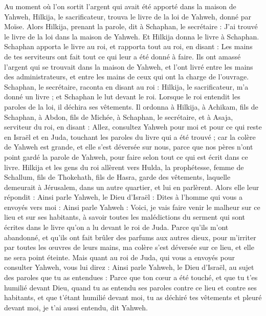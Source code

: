 \begin{multicols}{2}
Au moment où l'on sortit l'argent qui avait été apporté dans la maison de Yahweh, Hilkija, le sacrificateur, trouva le livre de la loi de Yahweh, donné par Moïse.
Alors Hilkija, prenant la parole, dit à Schaphan, le secrétaire : J'ai trouvé le livre de la loi dans la maison de Yahweh. Et Hilkija donna le livre à Schaphan.
Schaphan apporta le livre au roi, et rapporta tout au roi, en disant : Les mains de tes serviteurs ont fait tout ce qui leur a été donné à faire.
Ils ont amassé l'argent qui se trouvait dans la maison de Yahweh, et l'ont livré entre les mains des administrateurs, et entre les mains de ceux qui ont la charge de l'ouvrage.
Schaphan, le secrétaire, raconta en disant au roi : Hilkija, le sacrificateur, m'a donné un livre ; et Schaphan le lut devant le roi.
Lorsque le roi entendit les paroles de la loi, il déchira ses vêtements.
Il ordonna à Hilkija, à Achikam, fils de Schaphan, à Abdon, fils de Michée, à Schaphan, le secrétaire, et à Asaja, serviteur du roi, en disant :
Allez, consultez Yahweh pour moi et pour ce qui reste en Israël et en Juda, touchant les paroles du livre qui a été trouvé ; car la colère de Yahweh est grande, et elle s’est déversée sur nous, parce que nos pères n'ont point gardé la parole de Yahweh, pour faire selon tout ce qui est écrit dans ce livre.
Hilkija et les gens du roi allèrent vers Hulda, la prophétesse, femme de Schallum, fils de Thokehath, fils de Hasra, garde des vêtements, laquelle demeurait à Jérusalem, dans un autre quartier, et lui en parlèrent.
Alors elle leur répondit : Ainsi parle Yahweh, le Dieu d'Israël : Dites à l'homme qui vous a envoyés vers moi :
Ainsi parle Yahweh : Voici, je vais faire venir le malheur sur ce lieu et sur ses habitants, à  savoir toutes les malédictions du serment qui sont écrites dans le livre qu'on a lu devant le roi de Juda.
Parce qu'ils m'ont abandonné, et qu'ils ont fait brûler des parfums aux autres dieux, pour m'irriter par toutes les œuvres de leurs mains, ma colère s'est déversée sur ce lieu, et elle ne sera point éteinte.
Mais quant au roi de Juda, qui vous a envoyés pour consulter Yahweh, vous lui direz : Ainsi parle Yahweh, le Dieu d'Israël, au sujet des paroles que tu as entendues :
Parce que ton cœur a été touché, et que tu t'es humilié devant Dieu, quand tu as entendu ses paroles contre ce lieu et contre ses habitants, et que t'étant humilié devant moi, tu as déchiré tes vêtements et pleuré devant moi, je t'ai aussi entendu, dit Yahweh.

\end{multicols}
